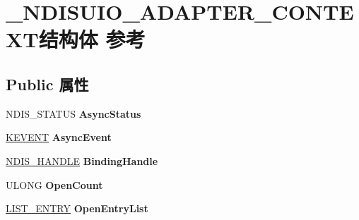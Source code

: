 \hypertarget{struct___n_d_i_s_u_i_o___a_d_a_p_t_e_r___c_o_n_t_e_x_t}{}\section{\+\_\+\+N\+D\+I\+S\+U\+I\+O\+\_\+\+A\+D\+A\+P\+T\+E\+R\+\_\+\+C\+O\+N\+T\+E\+X\+T结构体 参考}
\label{struct___n_d_i_s_u_i_o___a_d_a_p_t_e_r___c_o_n_t_e_x_t}
\subsection*{Public 属性}
\begin{DoxyCompactItemize}
\item 
\mbox{\label{struct___n_d_i_s_u_i_o___a_d_a_p_t_e_r___c_o_n_t_e_x_t_a277c6dde3a4a40d6f816c9b1159f21bd}} 
N\+D\+I\+S\+\_\+\+S\+T\+A\+T\+US {\bfseries Async\+Status}
\item 
\mbox{\label{struct___n_d_i_s_u_i_o___a_d_a_p_t_e_r___c_o_n_t_e_x_t_a1409b8408f37c9f9eae4c0111ec7b91a}} 
\hyperlink{struct___k_e_v_e_n_t}{K\+E\+V\+E\+NT} {\bfseries Async\+Event}
\item 
\mbox{\label{struct___n_d_i_s_u_i_o___a_d_a_p_t_e_r___c_o_n_t_e_x_t_af660f6ff4edf4c096a7bdf20507397c4}} 
\hyperlink{interfacevoid}{N\+D\+I\+S\+\_\+\+H\+A\+N\+D\+LE} {\bfseries Binding\+Handle}
\item 
\mbox{\label{struct___n_d_i_s_u_i_o___a_d_a_p_t_e_r___c_o_n_t_e_x_t_a69a49045c61014dafd8bfc0204f888ff}} 
U\+L\+O\+NG {\bfseries Open\+Count}
\item 
\mbox{\label{struct___n_d_i_s_u_i_o___a_d_a_p_t_e_r___c_o_n_t_e_x_t_a0e961883d52842551e3f898cddfa73df}} 
\hyperlink{struct___l_i_s_t___e_n_t_r_y}{L\+I\+S\+T\+\_\+\+E\+N\+T\+RY} {\bfseries Open\+Entry\+List}
\item 
\mbox{\label{struct___n_d_i_s_u_i_o___a_d_a_p_t_e_r___c_o_n_t_e_x_t_a5e1e2d7c17f44bc925acfd7ef9fd5a6d}} 

\end{DoxyCompactItemize}
